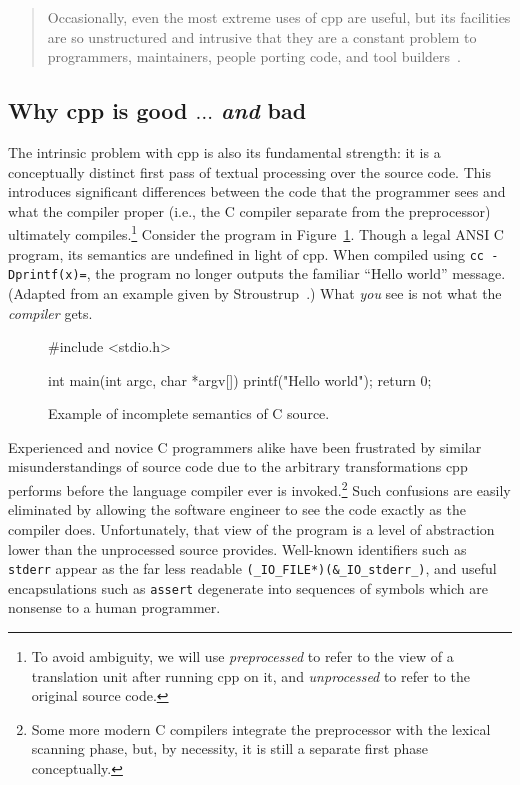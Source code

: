 \documentclass{article}
\newcommand{\Cpp}{\mbox{\textsf{cpp}}}
\newcommand{\C}{\mbox{C}}
\newcommand{\ie}{i.e.,}
\newcommand{\figref}[1]{Figure~\ref{#1}}
\begin{document}
\begin{quotation}
\noindent Occasionally, even the most extreme uses of \Cpp{} are useful, but its
facilities are so unstructured and intrusive that they are a constant
problem to programmers, maintainers, people porting code, and tool
builders~\cite[p.~424]{Stroustrup94}.
\end{quotation}

\subsection{Why \Cpp{} is good $\ldots$ \emph{and} bad}

The intrinsic problem with \Cpp{} is also its fundamental strength: it
is a conceptually distinct first pass of textual processing over the
source code.  This introduces significant differences between the code that the
programmer sees and what the compiler proper (\ie{} the \C{} compiler
separate from the preprocessor) ultimately compiles.\footnote{To avoid
  ambiguity, we will use \emph{preprocessed} to refer to the view of a
  translation unit after running \Cpp{} on it, and \emph{unprocessed} to
  refer to the original source code.} Consider the program in
\figref{fig:badmain}.  Though a legal ANSI \C{} program, its semantics are
undefined in light of \Cpp{}.  When compiled using \texttt{cc
  -Dprintf(x)=}, the program no longer outputs the familiar ``Hello
world'' message. (Adapted from an example given by
  Stroustrup~\cite[p.~423]{Stroustrup94}.)  What \emph{you} see is not
what the \emph{compiler} gets.

\begin{figure}[hbtp]
\begin{center}
\begin{small}
\begin{pseudocode}[3in]
#include <stdio.h>

int main(int argc, char *argv[]) {
  printf("Hello world");
  return 0;
}
\end{pseudocode}
\end{small}
\caption{Example of incomplete semantics of \C{} source.}
\label{fig:badmain}
\end{center}
\end{figure}

Experienced and novice \C{} programmers alike have been frustrated by
similar misunderstandings of source code due to the arbitrary
transformations \Cpp{} performs before the language compiler ever is
invoked.\footnote{Some more modern \C{} compilers integrate the
  preprocessor with the lexical scanning phase, but, by necessity, it is
  still a separate first phase conceptually.}  Such confusions are
easily eliminated by allowing the software engineer to see the code
exactly as the compiler does.  Unfortunately, that view of the program
is a level of abstraction lower than the unprocessed source provides.
Well-known identifiers such as \texttt{stderr} appear as the far less
readable \texttt{(\_IO\_FILE*)(\&\_IO\_stderr\_)},
and useful encapsulations such as \texttt{assert} degenerate into
sequences of symbols which are nonsense to a human programmer.
\end{document}
